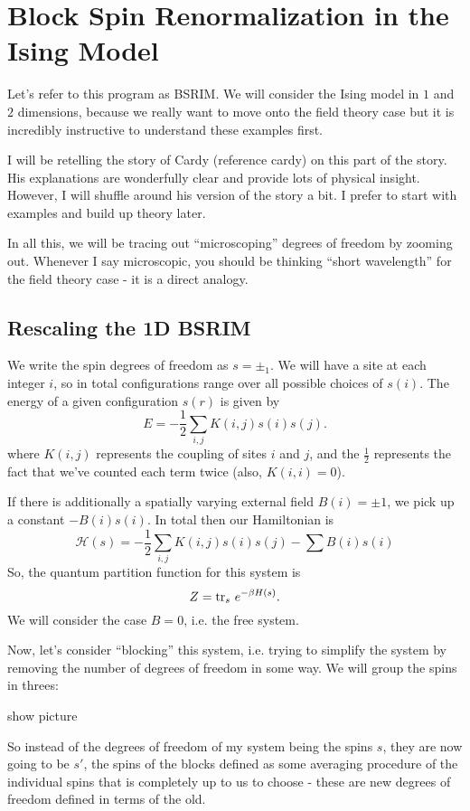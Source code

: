 \documentclass[main.tex]{subfiles}
\begin{document}
\section{Block Spin Renormalization in the Ising Model}
Let's refer to this program as BSRIM. We will consider the Ising model in $1$ and $2$ dimensions, because we really want to move onto the field theory case but it is incredibly instructive to understand these examples first. 

I will be retelling the story of Cardy (reference cardy) on this part of the story. His explanations are wonderfully clear and provide lots of physical insight. However, I will shuffle around his version of the story a bit. I prefer to start with examples and build up theory later.

In all this, we will be tracing out ``microscoping'' degrees of freedom by zooming out. Whenever I say microscopic, you should be thinking ``short wavelength'' for the field theory case - it is a direct analogy.
\subsection{Rescaling the 1D BSRIM}
We write the spin degrees of freedom as $s = \pm_1$. We will have a site at each integer $i$, so in total configurations range over all possible choices of $s(i)$. The energy of a given configuration $s(r)$ is given by
\[
E = - \frac{1}{2} \sum_{i,j} K(i,j) s(i) s(j).
\]
where $K(i,j)$ represents the coupling of sites $i$ and $j$, and the $\frac{1}{2}$ represents the fact that we've counted each term twice (also, $K(i,i) = 0$).

If there is additionally a spatially varying external field $B (i) = \pm 1$, we pick up a constant $-B(i) s(i)$. In total then our Hamiltonian is 
\[
\mathcal{H}(s) = - \frac{1}{2} \sum_{i,j} K(i,j) s(i) s(j) - \sum B(i) s(i)
\]
So, the quantum partition function for this system is 
\begin{equation} \label{Z}
Z = \tr_s \, e^{-\beta H(s)}.
\end{equation}
We will consider the case $B = 0$, i.e. the free system.

Now, let's consider ``blocking'' this system, i.e. trying to simplify the system by removing the number of degrees of freedom in some way. We will group the spins in threes:

show picture

So instead of the degrees of freedom of my system being the spins $s$, they are now going to be $s'$, the spins of the blocks defined as some averaging procedure of the individual spins that is completely up to us to choose - these are new degrees of freedom defined in terms of the old.
\end{document}
